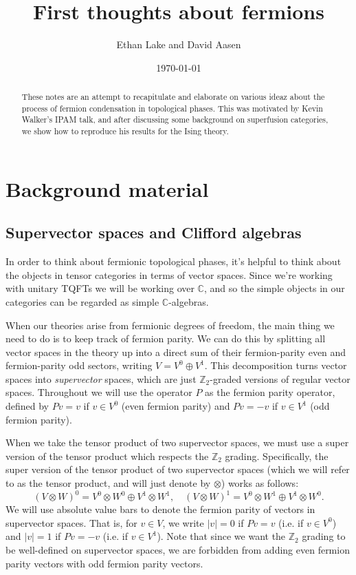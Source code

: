 \documentclass[12pt,a4paper]{article}
\newcommand{\tp}{\otimes}
\newcommand{\cc}{\mathbb{C}}
\newcommand{\zt}{\mathbb{Z}_2}
\newcommand\be            {\begin{equation}}
\newcommand\ee            {\end{equation}}
\begin{document}
\title{First thoughts about fermions}
\author{Ethan Lake and David Aasen}

\date{\today}

\maketitle


\begin{abstract}
These notes are an attempt to recapitulate and elaborate on various ideaz about the process of fermion condensation in topological phases. This was motivated by Kevin Walker's IPAM talk, and after discussing some background on superfusion categories, we show how to reproduce his results for the Ising theory.
\end{abstract}

\section{Background material} 

\subsection{Supervector spaces and Clifford algebras}
 
In order to think about fermionic topological phases, it's helpful to think about the objects in tensor 
categories in terms of vector spaces. Since we're working with unitary TQFTs we will be working over $\cc$, and so the simple objects in our categories can be regarded as simple $\cc$-algebras. 

When our theories arise from fermionic degrees of freedom, the main thing we need to do is to keep track of fermion parity. We can do this by splitting all vector spaces in the theory up into a direct sum of their fermion-parity even and fermion-parity odd sectors, writing $V = V^0 \oplus V^1$. This decomposition turns vector spaces into {\it supervector} spaces, which are just $\zt$-graded versions of regular vector spaces. Throughout we will use the operator $P$ as the fermion parity operator, defined by $Pv = v$ if $v\in V^0$ (even fermion parity) and $Pv = -v $ if $v\in V^1$ (odd fermion parity). 

When we take the tensor product of two supervector spaces, we must use a super version of the tensor product which respects the $\zt$ grading. Specifically, the super version of the tensor product of two supervector spaces (which we will refer to as the tensor product, and will just denote by $\tp$) works as follows:
\be (V\tp W)^0 = V^0 \tp W^0 \oplus V^1 \tp W^1,\quad (V\tp W)^1 = V^0 \tp W^1 \oplus V^1 \tp W^0.\ee
We will use absolute value bars to denote the fermion parity of vectors in supervector spaces. That is, for $v\in V$, we write $|v| = 0$ if $Pv = v$ (i.e. if $v\in V^0$) and $|v| = 1$ if $Pv = -v$ (i.e. if $v\in V^1$). Note that since we want the $\zt$ grading to be well-defined on supervector spaces, we are forbidden from adding even fermion parity vectors with odd fermion parity vectors. 
\end{document}
